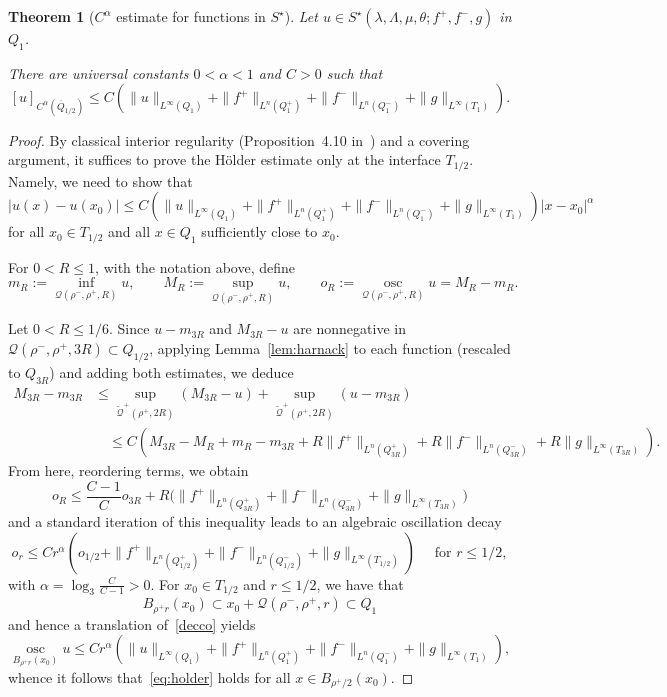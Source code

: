 \documentclass[letter,11pt]{amsart}
\newcommand{\osc}{\operatorname{osc}}
\newcommand{\gcal}{\mathcal{Q}}
\newtheorem{thm}{Theorem}[section]
\theoremstyle{definition}
\numberwithin{equation}{section}
\begin{document}
\begin{thm}[$C^{\alpha}$ estimate for functions in $S^{\star}$]
\label{thm:holder}
Let $u \in S^{\star}(\lambda, \Lambda,\mu,\theta; f^{+}, f^{-}, g)$ in $Q_1$.

There are universal constants $0 < \alpha < 1$ and $C >0$ such that
\[
[u]_{C^{\alpha}(\overline{Q}_{1/2})}
\leq C \left( \|u\|_{L^{\infty}(Q_1)} + 
\|f^{+}\|_{L^n(Q^{+}_1)} + \|f^{-}\|_{L^n(Q^{-}_1)}
+ \|g\|_{L^{\infty}(T_1)}\right).
\]
\end{thm}
\begin{proof}
By classical interior regularity (Proposition~4.10 in~\cite{CC}) and a covering argument, it suffices to prove the H\"{o}lder estimate only at the interface $T_{1/2}$. 
Namely, we need to show that
\begin{equation}
\label{eq:holder}
|u(x) - u(x_0)| \leq C \left( \|u\|_{L^{\infty}(Q_1)} 
+\|f^{+}\|_{L^n(Q^{+}_1)} + \|f^{-}\|_{L^n(Q^{-}_1)}
+ \|g\|_{L^{\infty}(T_1)}\right) |x-x_0|^{\alpha}
\end{equation}
for all $x_0 \in T_{1/2}$ and all $x \in Q_1$ sufficiently close to $x_0$.

\medskip

For $0 < R \leq 1$, with the notation above, define
\[
m_R := \inf_{\gcal(\rho^{-}, \rho^{+}, R)} u, 
\qquad M_R := \sup_{ \gcal(\rho^{-}, \rho^{+}, R)} u, 
\qquad o_R := \underset{\gcal(\rho^{-}, \rho^{+}, R)}{\osc} u = M_R - m_R.
\]

\medskip

Let $0 < R \leq 1/6$.
Since $u - m_{3R}$ and $M_{3R} - u$ are nonnegative in $\gcal(\rho^{-}, \rho^{+}, 3R) \subset Q_{1/2}$, applying Lemma~\ref{lem:harnack} to each function (rescaled to $Q_{3R}$) and adding both estimates, we deduce
\[
\begin{split}
M_{3R} -m_{3R} 
& \leq \sup_{\widetilde{\gcal}^{+}(\rho^{+}, 2R)} ( M_{3R} - u) + \sup_{\widetilde{\gcal}^{+}(\rho^{+}, 2R)} (u - m_{3R})\\
& \quad \leq C \left( 
M_{3R} - M_{R} +
m_{R} - m_{3R} 
+ R \|f^{+}\|_{L^n(Q_{3R}^{+})} + R\|f^{-}\|_{L^n(Q_{3R}^{-})}
+ R \|g\|_{L^{\infty}(T_{3R})}\right).
\end{split}
\]
From here, reordering terms, we obtain
\[
o_R \leq \frac{C-1}{C} o_{3R} + R \big( 
\|f^{+}\|_{L^n(Q_{3R}^{+})} + \|f^{-}\|_{L^n(Q_{3R}^{-})}
+ \|g\|_{L^{\infty}(T_{3R})}\big)
\]
and a standard iteration of this inequality leads to an algebraic oscillation decay
\begin{equation}
\label{decco}
o_{r} \leq C r^{\alpha}
\left(o_{1/2}+ \|f^{+}\|_{L^n(Q_{1/2}^{+})} + \|f^{-}\|_{L^n(Q_{1/2}^{-})}+ \|g\|_{L^{\infty}(T_{1/2})}\right) 
\quad \text{ for } r \leq 1/2,
\end{equation}
with $\alpha = \log_{3} \frac{C}{C-1} >0$.
For $x_0 \in T_{1/2}$ and $r \leq 1/2$, we have that
\[
B_{\rho^{+}r}(x_0) \subset x_0 + \gcal(\rho^{-}, \rho^{+}, r) \subset Q_1
\]
and hence a translation of~\eqref{decco} yields
\[
\underset{B_{\rho^{+} r}(x_0)}{\osc} u \leq C r^{\alpha} \left(\|u\|_{L^{\infty}(Q_1)}+ \|f^{+}\|_{L^n(Q_1^{+})} + \|f^{-}\|_{L^n(Q_1^{-})}+ \|g\|_{L^{\infty}(T_{1})} \right),
\]
whence it follows that~\eqref{eq:holder} holds for all $x \in B_{\rho^{+}/2}(x_0)$.
\end{proof}
\end{document}
